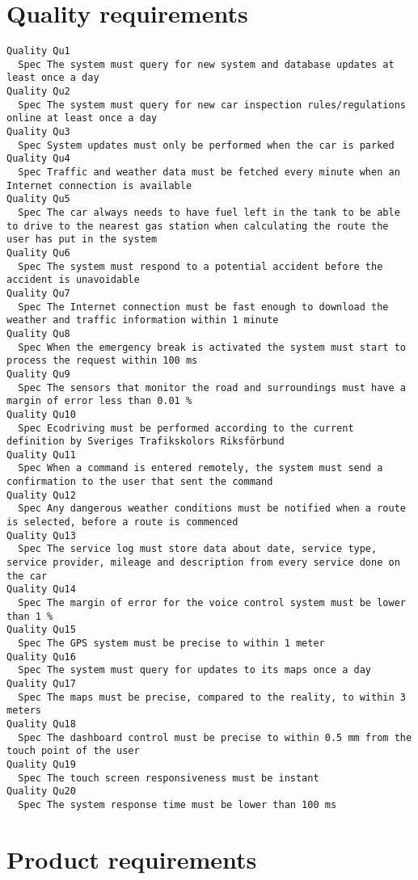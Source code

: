        \section{Quality requirements}


\begin{lstlisting}
Quality Qu1
  Spec The system must query for new system and database updates at least once a day
Quality Qu2
  Spec The system must query for new car inspection rules/regulations online at least once a day
Quality Qu3
  Spec System updates must only be performed when the car is parked
Quality Qu4
  Spec Traffic and weather data must be fetched every minute when an Internet connection is available
Quality Qu5
  Spec The car always needs to have fuel left in the tank to be able to drive to the nearest gas station when calculating the route the user has put in the system
Quality Qu6
  Spec The system must respond to a potential accident before the accident is unavoidable
Quality Qu7
  Spec The Internet connection must be fast enough to download the weather and traffic information within 1 minute
Quality Qu8
  Spec When the emergency break is activated the system must start to process the request within 100 ms
Quality Qu9
  Spec The sensors that monitor the road and surroundings must have a margin of error less than 0.01 %
Quality Qu10
  Spec Ecodriving must be performed according to the current definition by Sveriges Trafikskolors Riksförbund
Quality Qu11
  Spec When a command is entered remotely, the system must send a confirmation to the user that sent the command
Quality Qu12
  Spec Any dangerous weather conditions must be notified when a route is selected, before a route is commenced
Quality Qu13
  Spec The service log must store data about date, service type, service provider, mileage and description from every service done on the car
Quality Qu14
  Spec The margin of error for the voice control system must be lower than 1 %
Quality Qu15
  Spec The GPS system must be precise to within 1 meter
Quality Qu16
  Spec The system must query for updates to its maps once a day
Quality Qu17
  Spec The maps must be precise, compared to the reality, to within 3 meters
Quality Qu18
  Spec The dashboard control must be precise to within 0.5 mm from the touch point of the user
Quality Qu19
  Spec The touch screen responsiveness must be instant
Quality Qu20
  Spec The system response time must be lower than 100 ms

\end{lstlisting}


       \section{Product requirements}


